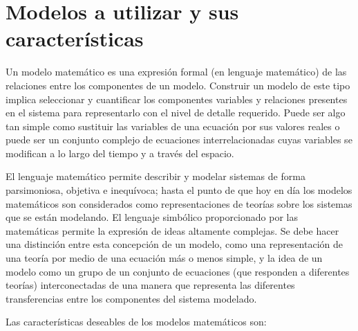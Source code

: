 \documentclass[11pt, letterpaper, spanish]{article}
\begin{document}
{    

 \newpage  

\section{Modelos a utilizar y sus características}
\par{Un modelo matemático es una expresión formal (en lenguaje matemático) de las relaciones entre los componentes de un modelo. Construir un modelo de este tipo implica seleccionar y cuantificar los componentes variables y relaciones presentes en el sistema para representarlo con el nivel de detalle requerido. Puede ser algo tan simple como sustituir las variables de una ecuación por sus valores reales o puede ser un conjunto complejo de ecuaciones interrelacionadas cuyas variables se modifican a lo largo del tiempo y a través del espacio.}
\par{El lenguaje matemático permite describir y modelar sistemas de forma parsimoniosa, objetiva e inequívoca; hasta el punto de que hoy en día los modelos matemáticos son considerados como representaciones de teorías sobre los sistemas que se están modelando. El lenguaje simbólico proporcionado por las matemáticas permite la expresión de ideas altamente complejas.}
Se debe hacer una distinción entre esta concepción de un modelo, como una representación de una teoría por medio de una ecuación más o menos simple, y la idea de un modelo como un grupo de un conjunto de ecuaciones (que responden a diferentes teorías) interconectadas de una manera que representa las diferentes transferencias entre los componentes del sistema modelado. 
\par{Las características deseables de los modelos matemáticos son:}

}
\end{document}
